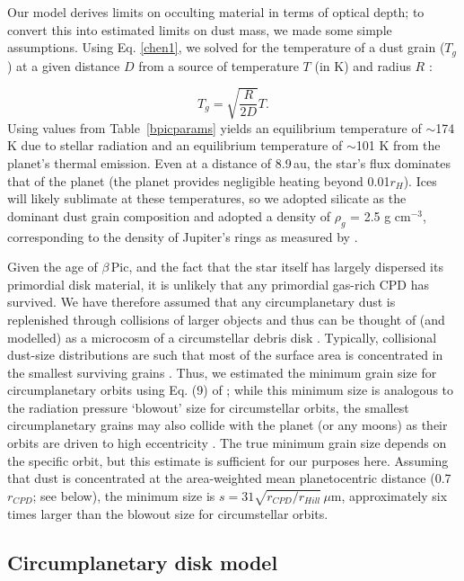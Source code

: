 \documentclass[longauth]{aa} %
\newcommand{\bp}{$\beta$\,Pic}
\begin{document}
Our model derives limits on occulting material in terms of optical depth; to convert this into estimated limits on dust mass, we made some simple assumptions.
%
Using Eq. \ref{chen1}, we solved for the temperature of a dust grain ($T_{g}$) at a given distance $D$ from a source of temperature $T$ (in K) and radius $R$ \citep{Chen01}:

\begin{equation}
\label{chen1}
T_{g} = \sqrt{\frac{R}{2D}}T
.\end{equation}
Using values from Table~\ref{bpicparams} yields an equilibrium temperature of $\sim$174 K due to stellar radiation and an equilibrium temperature of $\sim$101 K from the planet's thermal emission.
%
Even at a distance of 8.9\,au, the star's flux dominates that of the planet (the planet provides negligible heating beyond 0.01$r_H$). Ices will likely sublimate at these temperatures, so we adopted silicate as the dominant dust grain composition and adopted a density of $\rho_g$ = 2.5 g cm$^{-3}$, corresponding to the density of Jupiter's rings as measured by \citet{Chen01}.

Given the age of \bp{}, and the fact that the star itself has largely dispersed its primordial disk material, it is unlikely that any primordial gas-rich CPD has survived.
%
We have therefore assumed that any circumplanetary dust is replenished through collisions of larger objects and thus can be thought of (and modelled) as a microcosm of a circumstellar debris disk \citep[e.g.][]{Kennedy11}.
%
Typically, collisional dust-size distributions are such that most of the surface area is concentrated in the smallest surviving grains \citep{1969JGR....74.2531D}.
%
Thus, we estimated the minimum grain size for circumplanetary orbits using Eq. (9) of \citet{Kennedy11}; while this minimum size is analogous to the radiation pressure `blowout' size for circumstellar orbits, the smallest circumplanetary grains may also collide with the planet (or any moons) as their orbits are driven to high eccentricity \citep[see][]{Burns79}.
%
The true minimum grain size depends on the specific orbit, but this estimate is sufficient for our purposes here.
%
Assuming that dust is concentrated at the area-weighted mean planetocentric distance (0.7$r_{CPD}$; see below), the minimum size is $s = 31 \sqrt{r_{CPD}/r_{Hill}}$\,$\mu$m, approximately six times larger than the blowout size for circumstellar orbits.


\subsection{Circumplanetary disk model}\label{mellonestimate}
\end{document}
